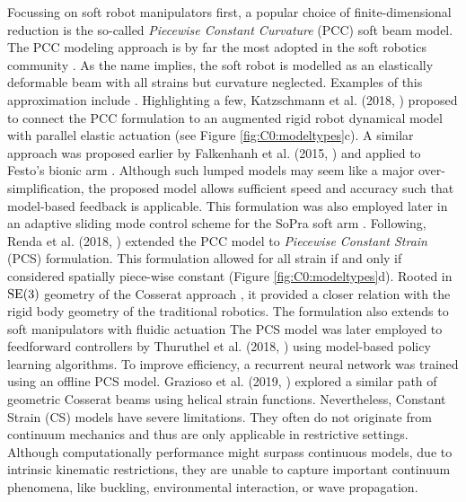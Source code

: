 %
\par
Focussing on soft robot manipulators first, a popular choice of finite-dimensional reduction is the so-called \textit{Piecewise Constant Curvature} (PCC) soft beam model.
The PCC modeling approach is by far the most adopted in the soft robotics community \cite{Webster2010}. As the name implies, the soft robot is modelled as an elastically deformable beam with all strains but curvature neglected. Examples of this approximation include \cite{Falkenhahn2015,Marchese2016,Katzschmann2018,Katzschmann2019,Runge2017,Franco2020,Webster2010,DellaSantina2020a}. Highlighting a few, Katzschmann et al. (2018, \cite{Katzschmann2018}) proposed to connect the PCC formulation to an augmented rigid robot dynamical model with parallel elastic actuation (see Figure \ref{fig:C0:modeltypes}c). A similar approach was proposed earlier by Falkenhanh et al. (2015, \cite{Falkenhahn2015}) and applied to Festo's bionic arm \cite{Grzesiak2011}. Although such lumped models may seem like a major over-simplification, the proposed model allows sufficient speed and accuracy such that model-based feedback is applicable. This formulation was also employed later in an adaptive sliding mode control scheme \cite{Kazemipour2022May} for the SoPra soft arm \cite{Toshimitsu2021Sep}. Following, Renda et al. (2018, \cite{Renda2018}) extended the PCC model to \textit{Piecewise Constant Strain} (PCS) formulation. This formulation allowed for all strain if and only if considered spatially piece-wise constant (Figure \ref{fig:C0:modeltypes}d). Rooted in $\textup{\textrm{SE}}(3)$ geometry of the Cosserat approach \cite{Simo1986}, it provided a closer relation with the rigid body geometry of the traditional robotics. The formulation also extends to soft manipulators with fluidic actuation \cite{Renda2017Aug, Till2019} The PCS model was later employed to feedforward controllers by Thuruthel et al. (2018, \cite{Thuruthel2018Nov}) using model-based policy learning algorithms. To improve efficiency, a recurrent neural network was trained using an offline PCS model. Grazioso et al. (2019, \cite{Grazioso2019}) explored a similar path of geometric Cosserat beams using helical strain functions. Nevertheless, Constant Strain (CS) models have severe limitations. They often do not originate from continuum mechanics and thus are only applicable in restrictive settings. Although computationally performance might surpass continuous models, due to intrinsic kinematic restrictions, they are unable to capture important continuum phenomena, like buckling, environmental interaction, or wave propagation.

